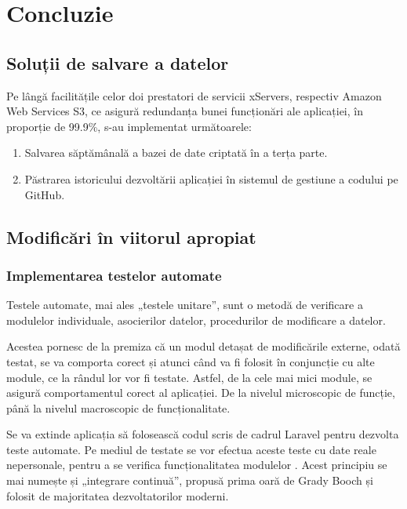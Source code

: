 \chapter{Concluzie}
\section{Soluții de salvare a datelor}

	Pe lângă facilitățile celor doi prestatori de servicii xServers, respectiv Amazon Web Services S3, ce asigură redundanța bunei funcționări ale aplicației, în proporție de 99.9\%, s-au implementat următoarele:
	\begin{enumerate}
		\item Salvarea săptămânală a bazei de date criptată în a terța parte.
		\item Păstrarea istoricului dezvoltării aplicației în sistemul de gestiune a codului pe GitHub.
	\end{enumerate}

\section{Modificări în viitorul apropiat}

	\subsection{Implementarea testelor automate}

		Testele automate, mai ales „testele unitare”, sunt o metodă de verificare a modulelor individuale, asocierilor datelor, procedurilor de modificare a datelor. \cite{testare_automata}

		Acestea pornesc de la premiza că un modul detașat de modificările externe, odată testat, se va comporta corect și atunci când va fi folosit în conjuncție cu alte module, ce la rândul lor vor fi testate.
		Astfel, de la cele mai mici module, se asigură comportamentul corect al aplicației. De la nivelul microscopic de funcție, până la nivelul macroscopic de funcționalitate.

		Se va extinde aplicația să folosească codul scris de cadrul Laravel pentru dezvolta teste automate.
		Pe mediul de testate se vor efectua aceste teste cu date reale nepersonale, pentru a se verifica funcționalitatea modulelor .
		 Acest principiu se mai numește și „integrare continuă”, propusă prima oară de Grady Booch \cite{integrare_continua} și folosit de majoritatea dezvoltatorilor moderni.



